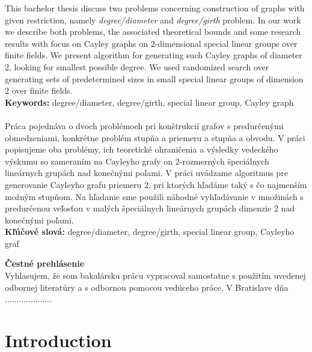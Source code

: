 \documentclass[a4paper,12pt,oneside]{report}%
\begin{document}
This bachelor thesis discuss two problems concerning construction of graphs with given restriction, namely {\em degree/diameter} and {\em degree/girth} problem. In our work we describe both problems, the associated theoretical bounds and some research results with focus on Cayley graphs on $2$-dimensional special linear groups over finite fields. We present algorithm for generating such Cayley graphs of diameter 2, looking for smallest possible degree. We used randomized search over generating sets of predetermined sizes in small special linear groups of dimension 2 over finite fields. 
~\\
{\bf{Keywords:}} degree/diameter, degree/girth, special linear group, Cayley graph
~\\~\\
Pr\'aca pojedn\'ava o dvoch probl\'emoch pri kon\v{s}trukci\'i grafov s predur\v{c}en\'ymi obmedzeniami, konkr\'etne probl\'em stup\v{n}a a priemeru a stup\v{n}a a obvodu. V pr\'aci popisujeme oba probl\'emy, ich teoretick\'e ohrani\v{c}enia a v\'ysledky vedeck\'eho v\'yskumu so zameran\'im na Cayleyho grafy on $2$-rozmern\'ych \v{s}peci\'alnych line\'arnych grup\'ach nad kone\v{c}n\'ymi po\v{l}ami. V pr\'aci uv\'adzame algoritmus pre generovanie Cayleyho grafu priemeru 2, pri ktor\'ych h\v{l}ad\'ame tak\'y s \v{c}o najmen\v{s}\'im mo\v{z}n\'ym stup\v{n}om. Na h\v{l}adanie sme pou\v{z}ili n\'ahodn\'e vyh\v{l}ad\'avanie v mno\v{z}in\'ach s predur\v{c}enou ve\v{l}os\v{t}ou v mal\'ych \v{s}peci\'alnych line\'arnych grup\'ach dimenzie 2 nad kone\v{c}n\'ymi po\v{l}ami. ~\\
{\bf{K\v{l}\'u\v{c}ov\'e slov\'a:}} degree/diameter, degree/girth, special linear group, Cayleyho graf

\newpage
	\vskip 5cm          %
	{\bf{\v{C}estn\'e prehl\'asenie}} ~\\
	Vyhlasujem, \v{z}e som bakal\'arsku pr\'acu vypracoval samostatne s pou\v{z}it\'im uvedenej odbornej literat\'ury a s odbornou pomocou ved\'uceho pr\'ace.
	\vskip 2cm          %
	V Bratislave d\v{n}a  
	\vskip 2cm          %
	\hskip 10cm .................... ~\\ 

\newpage

\tableofcontents

\newpage

\section{Introduction}
\end{document}
